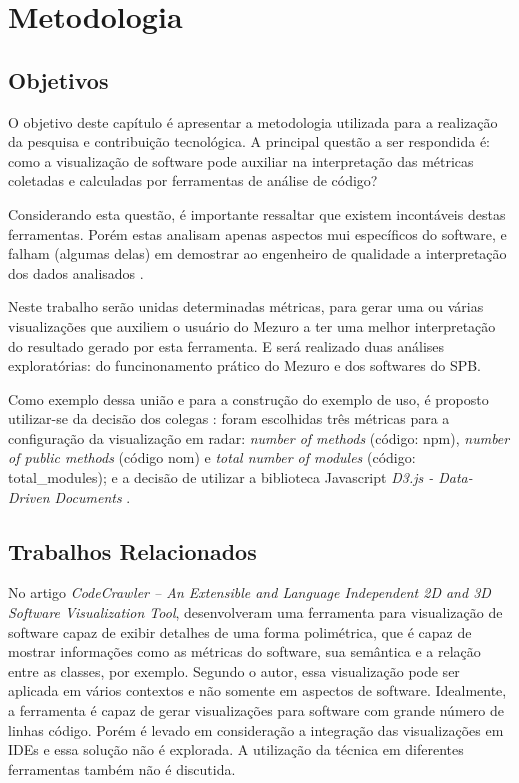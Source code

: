 \chapter{Metodologia}\label{metodologia}

\section{Objetivos}

O objetivo deste capítulo é apresentar a metodologia utilizada para a
realização da pesquisa e contribuição tecnológica. A principal questão
a ser respondida é: como a visualização de software pode auxiliar na
interpretação das métricas coletadas e calculadas por ferramentas de análise
de código?

Considerando esta questão, é importante ressaltar que existem incontáveis
destas ferramentas. Porém estas analisam apenas aspectos mui específicos
do software, e falham (algumas delas) em demostrar ao engenheiro de
qualidade a interpretação dos dados analisados \cite{deissenboeck2011quamoco}.

Neste trabalho serão unidas determinadas métricas, para gerar uma ou várias
visualizações que auxiliem o usuário do Mezuro a ter uma melhor interpretação do
resultado gerado por esta ferramenta. E será realizado duas análises
exploratórias: do funcinonamento prático do Mezuro e dos softwares do SPB.

Como exemplo dessa união e para a construção do exemplo de uso, é proposto
utilizar-se da decisão dos colegas :
foram escolhidas três métricas para a configuração da visualização em
radar: \textit{number of methods} (código: npm), \textit{number of public
methods} (código nom) e \textit{total number of modules} (código:
total\_modules); e a decisão de utilizar a biblioteca Javascript \textit{D3.js -
Data-Driven Documents} \cite{filgueiras2014mezuro}.

\section{Trabalhos Relacionados}

No artigo \textit{CodeCrawler – An Extensible and Language Independent 2D and
3D Software Visualization Tool}, 
desenvolveram uma ferramenta para visualização de software capaz de exibir
detalhes de uma forma polimétrica, que é capaz de mostrar informações como as
métricas do software, sua semântica e a relação entre as classes, por exemplo.
Segundo o autor, essa visualização pode ser aplicada em vários contextos e não
somente em aspectos de software. Idealmente, a ferramenta é capaz de gerar
visualizações para software com grande número de linhas código. Porém é levado
em consideração a integração das visualizações em IDEs e essa solução não é
explorada. A utilização da técnica em diferentes ferramentas também não é
discutida.

